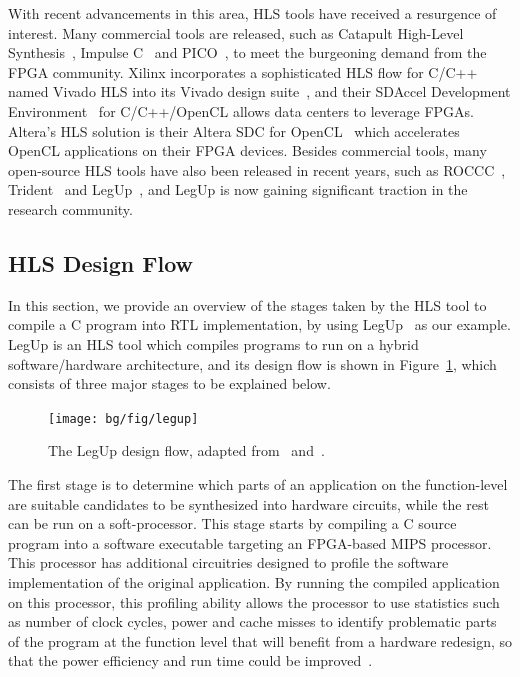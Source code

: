 With recent advancements in this area, HLS tools have received a resurgence
of interest.  Many commercial tools are released, such as Catapult
High-Level Synthesis~\cite{catapultc}, Impulse C~\cite{impulsec} and
PICO~\cite{schreiber02}, to meet the burgeoning demand from the FPGA community.
Xilinx incorporates a sophisticated HLS flow for C/C++ named Vivado HLS into
its Vivado design suite~\cite{vivado_hls}, and their SDAccel Development
Environment~\cite{sdaccel} for C/C++/OpenCL allows data centers to leverage
FPGAs.  Altera's HLS solution is their Altera SDC for OpenCL~\cite{aoc} which
accelerates OpenCL applications on their FPGA devices.  Besides commercial
tools, many open-source HLS tools have also been released in recent years, such
as ROCCC~\cite{roccc}, Trident~\cite{tripp05} and LegUp~\cite{legup}, and LegUp
is now gaining significant traction in the research community.


\subsection{HLS Design Flow}
\label{bg:sub:hls_design}

In this section, we provide an overview of the stages taken by the HLS tool
to compile a C program into RTL implementation, by using LegUp~\cite{legup,
canis13} as our example.  LegUp is an HLS tool which compiles programs to run
on a hybrid software/hardware architecture, and its design flow is shown in
Figure~\ref{bg:fig:legup}, which consists of three major stages to be explained
below.
\begin{figure}[ht]
    \centering
    \texttt{[image: bg/fig/legup]}
    \caption{%
        The LegUp design flow, adapted from~\cite{canis13} and~\cite{legup}.
    }\label{bg:fig:legup}
\end{figure}

The first stage is to determine which parts of an application on the
function-level are suitable candidates to be synthesized into hardware
circuits, while the rest can be run on a soft-processor.  This stage starts
by compiling a C source program into a software executable targeting an
FPGA-based MIPS processor.  This processor has additional circuitries designed
to profile the software implementation of the original application.  By running
the compiled application on this processor, this profiling ability allows the
processor to use statistics such as number of clock cycles, power and cache
misses to identify problematic parts of the program at the function level that
will benefit from a hardware redesign, so that the power efficiency and run
time could be improved~\cite{canis13}.

